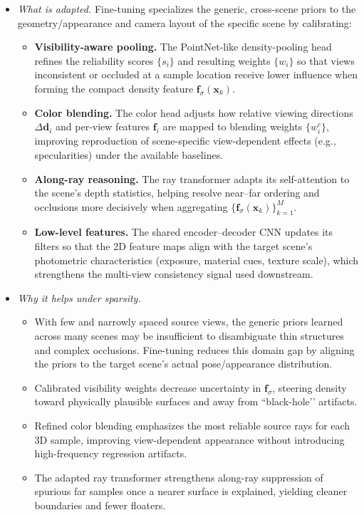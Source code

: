\begin{enrichment}
\begin{enrichment}
\begin{itemize}
         \item \emph{What is adapted.} Fine-tuning specializes the generic, cross-scene priors to the geometry/appearance and camera layout of the specific scene by calibrating:
         \begin{itemize}
             \item \textbf{Visibility-aware pooling.} The PointNet-like density-pooling head refines the reliability scores $\{s_i\}$ and resulting weights $\{w_i\}$ so that views inconsistent or occluded at a sample location receive lower influence when forming the compact density feature $\mathbf{f}_\sigma(\mathbf{x}_k)$.
             \item \textbf{Color blending.} The color head adjusts how relative viewing directions $\Delta\mathbf{d}_i$ and per-view features $\mathbf{f}_i$ are mapped to blending weights $\{w_i^c\}$, improving reproduction of scene-specific view-dependent effects (e.g., specularities) under the available baselines.
             \item \textbf{Along-ray reasoning.} The ray transformer adapts its self-attention to the scene’s depth statistics, helping resolve near–far ordering and occlusions more decisively when aggregating $\{\mathbf{f}_\sigma(\mathbf{x}_k)\}_{k=1}^M$.
             \item \textbf{Low-level features.} The shared encoder--decoder CNN updates its filters so that the 2D feature maps align with the target scene’s photometric characteristics (exposure, material cues, texture scale), which strengthens the multi-view consistency signal used downstream.
         \end{itemize}
         
         \item \emph{Why it helps under sparsity.}
         \begin{itemize}
             \item With few and narrowly spaced source views, the generic priors learned across many scenes may be insufficient to disambiguate thin structures and complex occlusions. Fine-tuning reduces this domain gap by aligning the priors to the target scene’s actual pose/appearance distribution.
             \item Calibrated visibility weights decrease uncertainty in $\mathbf{f}_\sigma$, steering density toward physically plausible surfaces and away from “black-hole’’ artifacts.
             \item Refined color blending emphasizes the most reliable source rays for each 3D sample, improving view-dependent appearance without introducing high-frequency regression artifacts.
             \item The adapted ray transformer strengthens along-ray suppression of spurious far samples once a nearer surface is explained, yielding cleaner boundaries and fewer floaters.
         \end{itemize}
         

\end{itemize}
\end{enrichment}
\end{enrichment}
